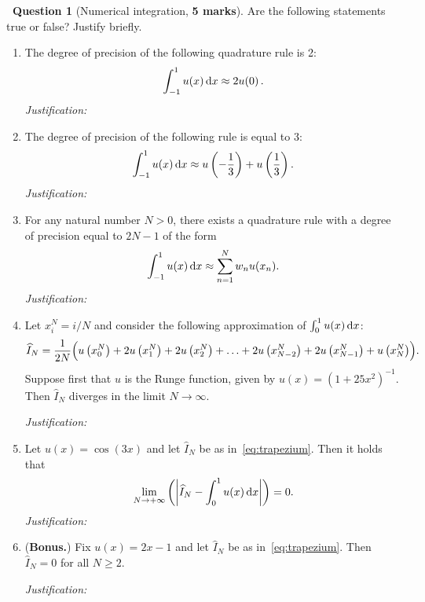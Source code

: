 \documentclass[10pt]{article}
\theoremstyle{definition}
\newtheorem{question}{{\normalfont \faGears}~Question}
\renewcommand{\mymarks}[1]{\textbf{#1 marks}}
\begin{document}
\newpage
\begin{question}
    [Numerical integration, \mymarks{5}]
    Are the following statements true or false?
    Justify briefly.
    \begin{enumerate}
        \item
            The degree of precision of the following quadrature rule is 2:
            \[
                \int_{-1}^{1} u(x) \, \mathrm d x \approx 2u(0) \, .
            \]
            \textit{Justification:}
            \vspace{.7cm}

        \item
            The degree of precision of the following rule is equal to 3:
            \[
                \int_{-1}^{1} u(x) \, \mathrm d x \approx u \left(-\frac{1}{3}\right) + u \left(\frac{1}{3}\right).
            \]
            \textit{Justification:}
            \vspace{.7cm}

        \item
            For any natural number $N > 0$,
            there exists a quadrature rule with a degree of precision equal to $2N - 1$ of the form
            \[
                \int_{-1}^{1} u(x) \, \mathrm d x \approx
                \sum_{n=1}^{N} w_n u(x_n).
            \]
            \textit{Justification:}
            \vspace{.7cm}

        \item
            Let $x^N_i = i/N$ and consider the following approximation of $\int_{0}^{1} u(x) \, \mathrm d x$:
            \begin{equation}
                \label{eq:trapezium}
                \widehat I_N = \frac{1}{2N} \Bigl( u\left(x^N_0\right) + 2 u\left(x^N_1\right) + 2 u\left(x^N_2\right) + \dotsc + 2 u\left(x^N_{N-2}\right) + 2 u\left(x^N_{N-1}\right) + u\left(x^N_N\right) \Bigr).
            \end{equation}
            Suppose first that $u$ is the Runge function, given by $u(x) = (1 + 25 x^2)^{-1}$.
            Then $\widehat I_N$ diverges in the limit $N \to \infty$.

            \textit{Justification:}
            \vspace{.7cm}

        \item
            Let $u(x) = \cos(3x)$ and let $\widehat I_N$ be as in~\eqref{eq:trapezium}.
            Then it holds that
            \[
                \lim_{N \to +\infty}
                \left( \left\lvert \widehat I_N - \int_{0}^1 u(x) \, \mathrm d x \right\rvert \right) = 0.
            \]
            \textit{Justification:}
            \vspace{.7cm}

        \item
            (\textbf{Bonus.})
            Fix $u(x) = 2x - 1$ and let $\widehat I_N$ be as in~\eqref{eq:trapezium}.
            Then $\widehat I_N = 0$ for all $N \geq 2$.

            \textit{Justification:}
            \vspace{.7cm}
    \end{enumerate}
\end{question}
\end{document}

